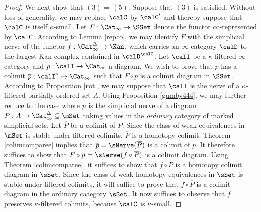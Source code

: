 \begin{proof}
We next show that $(3) \Rightarrow (5)$. Suppose that $(3)$ is satisfied. Without loss of generality, we may replace $\calC$ by $\calC'$ and thereby suppose that $\calC$ is itself $\kappa$-small. Let
$F: \Cat_{\infty} \rightarrow \SSet$ denote the functor co-represented by $\calC$. According
to Lemma \ref{repco}, we may identify $F$ with the simplicial nerve of the functor
$f: \Cat_{\infty}^{\Delta} \rightarrow \Kan$, which carries an $\infty$-category
$\calD$ to the largest Kan complex contained in $\calD^{\calC}$. Let $\calI$ be a $\kappa$-filtered $\infty$-category and $p: \calI \rightarrow \Cat_{\infty}$ a diagram. We wish to prove that
$p$ has a colimit $\overline{p}: \calI^{\triangleright} \rightarrow \Cat_{\infty}$ such that
$F \circ \overline{p}$ is a colimit diagram in $\SSet$. According to Proposition \ref{rot}, we may suppose that $\calI$ is the nerve of a $\kappa$-filtered partially ordered set $A$. Using Proposition \ref{gumby444}, we may further reduce to the case where $p$ is the simplicial nerve of a diagram $P: A \rightarrow \Cat_{\infty}^{\Delta} \subseteq \mSet$ taking values in the {\em ordinary} category of marked simplicial sets. Let $\overline{P}$ be a colimit of $P$. Since the class of weak equivalences in $\mSet$ is stable under filtered colimits, $\overline{P}$ is a homotopy colimit. Theorem \ref{colimcomparee} implies that $\overline{p} = \sNerve(\overline{P})$ is a colimit of $p$.
It therefore suffices to show that $F \circ \overline{p} = \sNerve( f \circ \overline{P})$ is a colimit diagram. Using Theorem \ref{colimcomparee}, it suffices to show that $f \circ \overline{P}$ is a homotopy colimit diagram in $\sSet$. Since the class of weak homotopy equivalences in $\sSet$ is stable under filtered colimits, it will suffice to prove that $f \circ \overline{P}$ is a colimit diagram in the ordinary category $\sSet$. It now suffices to observe that $f$ preserves $\kappa$-filtered colimits, because $\calC$ is $\kappa$-small.


\end{proof}
